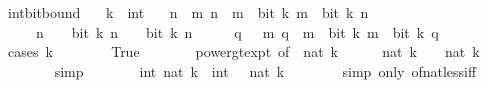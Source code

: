 \begin{isabellebody}
\endisatagproof
{\isafoldproof}%
%
\isadelimproof
\isanewline
%
\endisadelimproof
\isanewline
{}\isamarkupfalse%
\ int{\isacharunderscore}{\kern0pt}bit{\isacharunderscore}{\kern0pt}bound{\isacharcolon}{\kern0pt}\isanewline
\ \ \ k\ {\isacharcolon}{\kern0pt}{\isacharcolon}{\kern0pt}\ int\isanewline
\ \ \ n\ \ {\isacartoucheopen}{\isasymAnd}m{\isachardot}{\kern0pt}\ n\ {\isasymle}\ m\ {\isasymLongrightarrow}\ bit\ k\ m\ {\isasymlongleftrightarrow}\ bit\ k\ n{\isacartoucheclose}\isanewline
\ \ \ \ \ {\isacartoucheopen}n\ {\isachargreater}{\kern0pt}\ {}\ {\isasymLongrightarrow}\ bit\ k\ {\isacharparenleft}{\kern0pt}n\ {\isacharminus}{\kern0pt}\ {}{\isacharparenright}{\kern0pt}\ {\isasymnoteq}\ bit\ k\ n{\isacartoucheclose}\isanewline
%
\isadelimproof
%
\endisadelimproof
%
\isatagproof
{}\isamarkupfalse%
\ {\isacharminus}{\kern0pt}\isanewline
\ \ \isamarkupfalse%
\ q\ \ {\isacharasterisk}{\kern0pt}{\isacharcolon}{\kern0pt}\ {\isacartoucheopen}{\isasymAnd}m{\isachardot}{\kern0pt}\ q\ {\isasymle}\ m\ {\isasymLongrightarrow}\ bit\ k\ m\ {\isasymlongleftrightarrow}\ bit\ k\ q{\isacartoucheclose}\isanewline
\ \ \isamarkupfalse%
\ {\isacharparenleft}{\kern0pt}cases\ {\isacartoucheopen}k\ {\isasymge}\ {}{\isacartoucheclose}{\isacharparenright}{\kern0pt}\isanewline
\ \ \ \ \isamarkupfalse%
\ True\isanewline
\ \ \ \ \isamarkupfalse%
\ \isamarkupfalse%
\ power{\isacharunderscore}{\kern0pt}gt{\isacharunderscore}{\kern0pt}expt\ {\isacharbrackleft}{\kern0pt}of\ {}\ {\isacartoucheopen}nat\ k{\isacartoucheclose}{\isacharbrackright}{\kern0pt}\isanewline
\ \ \ \ \isamarkupfalse%
\ {\isacartoucheopen}nat\ k\ {\isacharless}{\kern0pt}\ {}\ {\isacharcircum}{\kern0pt}\ nat\ k{\isacartoucheclose}\isanewline
\ \ \ \ \ \ \isamarkupfalse%
\ simp\isanewline
\ \ \ \ \isamarkupfalse%
\ \isamarkupfalse%
\ {\isacartoucheopen}int\ {\isacharparenleft}{\kern0pt}nat\ k{\isacharparenright}{\kern0pt}\ {\isacharless}{\kern0pt}\ int\ {\isacharparenleft}{\kern0pt}{}\ {\isacharcircum}{\kern0pt}\ nat\ k{\isacharparenright}{\kern0pt}{\isacartoucheclose}\isanewline
\ \ \ \ \ \ \isamarkupfalse%
\ {\isacharparenleft}{\kern0pt}simp\ only{\isacharcolon}{\kern0pt}\ of{\isacharunderscore}{\kern0pt}nat{\isacharunderscore}{\kern0pt}less{\isacharunderscore}{\kern0pt}iff{\isacharparenright}{\kern0pt}\isanewline

\end{isabellebody}
